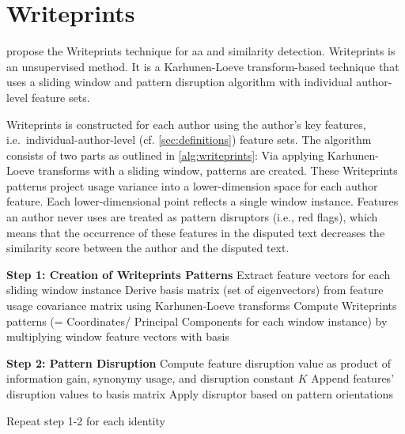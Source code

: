 \newcommand{\writeprints}{Writeprints}
\section{\writeprints{}}
\label{sec:writeprints}

\citet{abbasi_writeprints_2008} propose the \writeprints{} technique for \ac{aa} and similarity detection.
\writeprints{} is an unsupervised method. %
It is a Karhunen-Loeve transform-based technique that uses a sliding window and 
pattern disruption algorithm with individual author-level feature sets.

\writeprints{} is constructed for each author using the author's key features, 
i.e.\ individual-author-level (cf. \autoref{sec:definitions}) feature sets.
The algorithm consists of two parts as outlined in \autoref{alg:writeprints}:
Via applying Karhunen-Loeve transforms with a sliding window, patterns are created.
These \writeprints{} patterns project usage variance into a lower-dimension space for each author feature.
Each lower-dimensional point reflects a single window instance.
Features an author never uses are treated as pattern disruptors (i.e., red flags), 
which means that the occurrence of these features in the disputed text decreases the similarity score 
between the author and the disputed text.

\begin{algorithm}
\caption{Writeprints Steps}
\label{alg:writeprints}
\begin{algorithmic}[1]

        \State \textbf{Step 1: Creation of \writeprints{} Patterns}
            
            \State Extract feature vectors for each sliding window instance 
            \State Derive basis matrix (set of eigenvectors) from feature usage covariance matrix using Karhunen-Loeve transforms 
            \State Compute \writeprints{} patterns (= Coordinates/ Principal Components for each window instance) by multiplying window feature vectors with basis
        \EndFor
       

        \State \textbf{Step 2: Pattern Disruption}  
         
            \State Compute feature disruption value as product of information gain, synonymy usage, and disruption constant $K$
            \State Append features' disruption values to basis matrix
            \State Apply disruptor based on pattern orientations
          
        \EndFor

        \State Repeat step 1-2 for each identity
    \EndProcedure
\end{algorithmic}
\end{algorithm}



